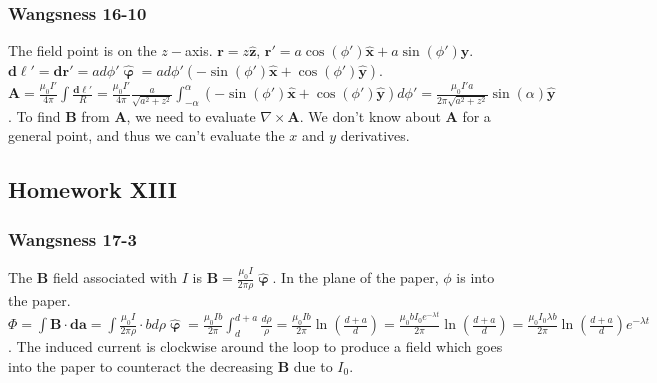 \documentclass[oneside]{book}
\theoremstyle{mystyle}
\begin{document}
\subsubsection{Wangsness 16-10}
The field point is on the $z-$axis. $\mathbf{r} = z\hat{\mathbf{z}}$, $\mathbf{r}' =  a\cos(\phi')\hat{\mathbf{x}}+a\sin(\phi')\hat{\mathbf{y}}$. $\mathbf{d\ell}' = \mathbf{dr}' = ad\phi' \hat{\boldsymbol{\upvarphi}} = ad\phi' (-\sin(\phi')\hat{\mathbf{x}}+\cos(\phi')\hat{\mathbf{y}})$. $\mathbf{A} = \frac{\mu_0 I'}{4\pi} \int \frac{\mathbf{d\ell}'}{R} = \frac{\mu_0 I'}{4\pi} \frac{a}{\sqrt{a^2+z^2}}\int_{-\alpha}^{\alpha} (-\sin(\phi')\hat{\mathbf{x}}+\cos(\phi')\hat{\mathbf{y}})d\phi' = \frac{\mu_0 I'a}{2\pi \sqrt{a^2+z^2}}\sin(\alpha)\hat{\mathbf{y}}$. To find $\mathbf{B}$ from $\mathbf{A}$, we need to evaluate $\nabla \times \mathbf{A}$. We don't know about $\mathbf{A}$ for a general point, and thus we can't evaluate the $x$ and $y$ derivatives.
\subsection{Homework XIII}
\subsubsection{Wangsness 17-3}
The $\mathbf{B}$ field associated with $I$ is $\mathbf{B} = \frac{\mu_0 I}{2\pi \rho} \hat{\boldsymbol{\upvarphi}}$. In the plane of the paper, $\phi$ is into the paper. $\Phi = \int \mathbf{B}\cdot \mathbf{da} = \int \frac{\mu_0 I}{2\pi \rho} \cdot b d\rho \hat{\boldsymbol{\upvarphi}} = \frac{\mu_0Ib}{2\pi} \int_{d}^{d+a} \frac{d\rho}{\rho}= \frac{\mu_0 Ib}{2\pi} \ln(\frac{d+a}{d}) = \frac{\mu_0 bI_0 e^{-\lambda t}}{2\pi} \ln(\frac{d+a}{d}) = \frac{\mu_0 I_0 \lambda b}{2\pi} \ln(\frac{d+a}{d})e^{-\lambda t}$. The induced current is clockwise around the loop to produce a field which goes into the paper to counteract the decreasing $\mathbf{B}$ due to $I_0$.
\end{document}
